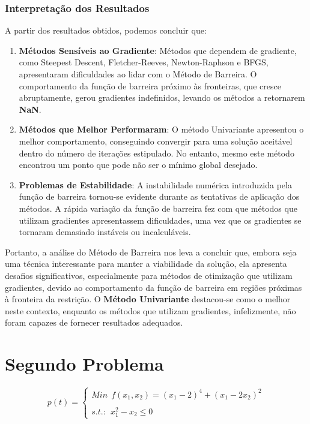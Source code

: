 \documentclass[a4paper, 12pt]{article}
\begin{document}
\subsubsection{Interpretação dos Resultados}

A partir dos resultados obtidos, podemos concluir que:

\begin{enumerate}
    \item \textbf{Métodos Sensíveis ao Gradiente}: Métodos que dependem de gradiente, como Steepest Descent, Fletcher-Reeves, Newton-Raphson e BFGS, apresentaram dificuldades ao lidar com o Método de Barreira. O comportamento da função de barreira próximo às fronteiras, que cresce abruptamente, gerou gradientes indefinidos, levando os métodos a retornarem \textbf{NaN}.
    \item \textbf{Métodos que Melhor Performaram}: O método Univariante apresentou o melhor comportamento, conseguindo convergir para uma solução aceitável dentro do número de iterações estipulado. No entanto, mesmo este método encontrou um ponto que pode não ser o mínimo global desejado.
    \item \textbf{Problemas de Estabilidade}: A instabilidade numérica introduzida pela função de barreira tornou-se evidente durante as tentativas de aplicação dos métodos. A rápida variação da função de barreira fez com que métodos que utilizam gradientes apresentassem dificuldades, uma vez que os gradientes se tornaram demasiado instáveis ou incalculáveis.
\end{enumerate}

Portanto, a análise do Método de Barreira nos leva a concluir que, embora seja uma técnica interessante para manter a viabilidade da solução, ela apresenta desafios significativos, especialmente para métodos de otimização que utilizam gradientes, devido ao comportamento da função de barreira em regiões próximas à fronteira da restrição. O \textbf{Método Univariante} destacou-se como o melhor neste contexto, enquanto os métodos que utilizam gradientes, infelizmente, não foram capazes de fornecer resultados adequados.







\newpage
\section{Segundo Problema}

\begin{equation}
     p(t) = \left\{ \begin{array}{rcl}
            Min \>\ f(x_1, x_2) = (x_1 - 2)^4 + (x_1 - 2x_2)^2 \\ \\
            s.t.: \>\ x_1^2 - x_2 \leq 0           \end{array} \right.
\end{equation} \\
\end{document}
